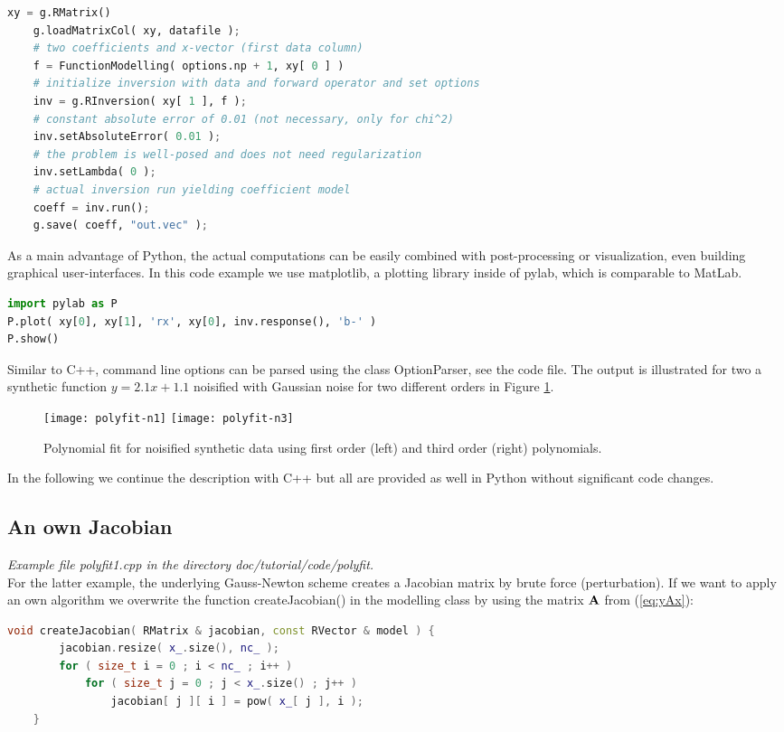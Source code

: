 \begin{lstlisting}[language=python]
    xy = g.RMatrix()
    g.loadMatrixCol( xy, datafile );
    # two coefficients and x-vector (first data column)
    f = FunctionModelling( options.np + 1, xy[ 0 ] )
    # initialize inversion with data and forward operator and set options
    inv = g.RInversion( xy[ 1 ], f );
    # constant absolute error of 0.01 (not necessary, only for chi^2)
    inv.setAbsoluteError( 0.01 );
    # the problem is well-posed and does not need regularization
    inv.setLambda( 0 );
    # actual inversion run yielding coefficient model
    coeff = inv.run();
    g.save( coeff, "out.vec" );
\end{lstlisting}

As a main advantage of Python, the actual computations can be easily combined with post-processing or visualization, even building graphical user-interfaces. 
In this code example we use matplotlib, a plotting library inside of pylab, which is comparable to MatLab.

\begin{lstlisting}[language=python]
import pylab as P
P.plot( xy[0], xy[1], 'rx', xy[0], inv.response(), 'b-' )
P.show()
\end{lstlisting}

Similar to C++, command line options can be parsed using the class OptionParser, see the code file.
The output is illustrated for two a synthetic function $y=2.1x+1.1$ noisified with Gaussian noise for two different orders in Figure \ref{fig:polyfit}.

\begin{figure}[hbt]%
\texttt{[image: polyfit-n1]}\hfill
\texttt{[image: polyfit-n3]}%
\caption{Polynomial fit for noisified synthetic data using first order (left) and third order (right) polynomials.}%
\label{fig:polyfit}%
\end{figure}

In the following we continue the description with C++ but all are provided as well in Python without significant code changes.

\subsection{An own Jacobian}
{\em Example file polyfit1.cpp in the directory doc/tutorial/code/polyfit.}\\
For the latter example, the underlying Gauss-Newton scheme creates a Jacobian matrix by brute force (perturbation).
If we want to apply an own algorithm we overwrite the function createJacobian() in the modelling class by using the matrix $\mathbf{A}$ from (\ref{eq:yAx}):
\begin{lstlisting}[language=C++,morekeywords={RMatrix,RVector,size_t}]
    void createJacobian( RMatrix & jacobian, const RVector & model ) {
        jacobian.resize( x_.size(), nc_ );
        for ( size_t i = 0 ; i < nc_ ; i++ )
            for ( size_t j = 0 ; j < x_.size() ; j++ )
                jacobian[ j ][ i ] = pow( x_[ j ], i );
    }
\end{lstlisting}

